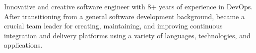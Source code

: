 \textcolor{awesome}{\raisebox{0.1\height}{\faBook\thinspace}}


\begin{cvparagraph}

Innovative and creative software engineer with 8+ years of experience in DevOps. After transitioning from a general software development background, became a crucial team leader for creating, maintaining, and improving continuous integration and delivery platforms using a variety of languages, technologies, and applications.
\end{cvparagraph}
